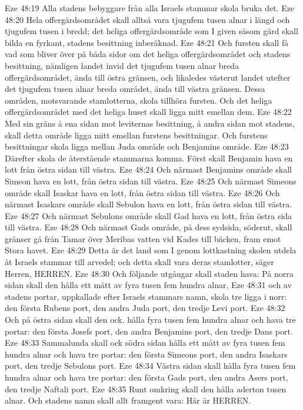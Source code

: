 Eze 48:19  Alla stadens bebyggare från alla Israels stammar skola bruka det.
Eze 48:20  Hela offergärdsområdet skall alltså vara tjugufem tusen alnar i längd och tjugufem tusen i bredd; det heliga offergärdsområde som I given såsom gärd skall bilda en fyrkant, stadens besittning inberäknad.
Eze 48:21  Och fursten skall få vad som bliver över på båda sidor om det heliga offergärdsområdet och stadens besittning, nämligen landet invid det tjugufem tusen alnar breda offergärdsområdet, ända till östra gränsen, och likaledes västerut landet utefter det tjugufem tusen alnar breda området, ända till västra gränsen. Dessa områden, motsvarande stamlotterna, skola tillhöra fursten. Och det heliga offergärdsområdet med det heliga huset skall ligga mitt emellan dem.
Eze 48:22  Med sin gräns å ena sidan mot leviternas besittning, å andra sidan mot stadens, skall detta område ligga mitt emellan furstens besittningar. Och furstens besittningar skola ligga mellan Juda område och Benjamins område.
Eze 48:23  Därefter skola de återstående stammarna komma. Först skall Benjamin hava en lott från östra sidan till västra.
Eze 48:24  Och närmast Benjamins område skall Simeon hava en lott, från östra sidan till västra.
Eze 48:25  Och närmast Simeons område skall Isaskar hava en lott, från östra sidan till västra.
Eze 48:26  Och närmast Isaskars område skall Sebulon hava en lott, från östra sidan till västra.
Eze 48:27  Och närmast Sebulons område skall Gad hava en lott, från östra sida till västra.
Eze 48:28  Och närmast Gads område, på dess sydsida, söderut, skall gränser gå från Tamar över Meribas vatten vid Kades till bäcken, fram emot Stora havet.
Eze 48:29  Detta är det land som I genom lottkastning skolen utdela åt Israels stammar till arvedel; och detta skall vara deras stamlotter, säger Herren, HERREN.
Eze 48:30  Och följande utgångar skall staden hava: På norra sidan skall den hålla ett mått av fyra tusen fem hundra alnar,
Eze 48:31  och av stadens portar, uppkallade efter Israels stammars namn, skola tre ligga i norr: den första Rubens port, den andra Juda port, den tredje Levi port.
Eze 48:32  Och på östra sidan skall den ock. hålla fyra tusen fem hundra alnar och hava tre portar: den första Josefs port, den andra Benjamins port, den tredje Dans port.
Eze 48:33  Sammalunda skall ock södra sidan hålla ett mått av fyra tusen fem hundra alnar och hava tre portar: den första Simeons port, den andra Isaskars port, den tredje Sebulons port.
Eze 48:34  Västra sidan skall hålla fyra tusen fem hundra alnar och hava tre portar: den första Gads port, den andra Asers port, den tredje Naftali port.
Eze 48:35  Runt omkring skall den hålla aderton tusen alnar. Och stadens namn skall allt framgent vara: Här är HERREN.


